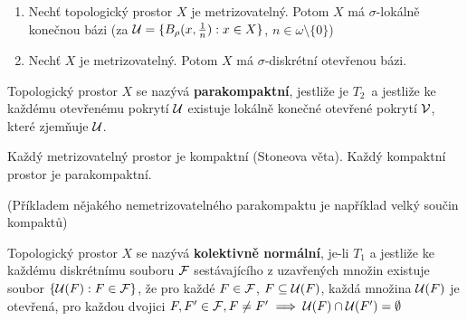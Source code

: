 \documentclass[12pt,a4paper]{article}
\newcommand{\head}[1]{\medskip\noindent {\bf #1}}
\newcommand\Hausd{$T_2$}
\begin{document}
\head{Důsledky:}
\begin{enumerate}
	\item Nechť topologický prostor $X$ je metrizovatelný. Potom $X$ má
	$\sigma$-lokálně konečnou bázi (za $\mathcal{ U }=\{B_\rho(x, \frac{1}{n}) : x \in
	X\}$, $n \in \omega \setminus \{0\}$)

	\item Nechť $X$ je metrizovatelný. Potom $X$ má $\sigma$-diskrétní
		otevřenou bázi.
\end{enumerate}

 Topologický prostor $X$ se nazývá {\bf parakompaktní}, jestliže je
	\Hausd~a jestliže ke každému otevřenému pokrytí $\mathcal{ U }$ existuje lokálně
	konečné otevřené pokrytí $\mathcal{ V }$, které zjemňuje $\mathcal{ U }$.

\priklad Každý metrizovatelný prostor je kompaktní (Stoneova věta). Každý
	kompaktní prostor je parakompaktní.

(Příkladem nějakého nemetrizovatelného parakompaktu je například velký součin
kompaktů)

 Topologický prostor $X$ se nazývá {\bf kolektivně normální}, je-li
	$T_1$ a jestliže ke každému diskrétnímu souboru $\mathcal{ F }$ sestávajícího z
	uzavřených množin existuje soubor $\{\mathcal{ U }(F) : F \in \mathcal{ F }\}$, že pro každé
	$F \in \mathcal{ F }$, $F \subseteq \mathcal{ U }(F)$, každá množina $\mathcal{ U }(F)$ je otevřená,
	pro každou dvojici $F, F' \in \mathcal{ F }, F \neq F' \implies \mathcal{ U }(F) \cap \mathcal{ U }(F') = \emptyset$
\end{document}
